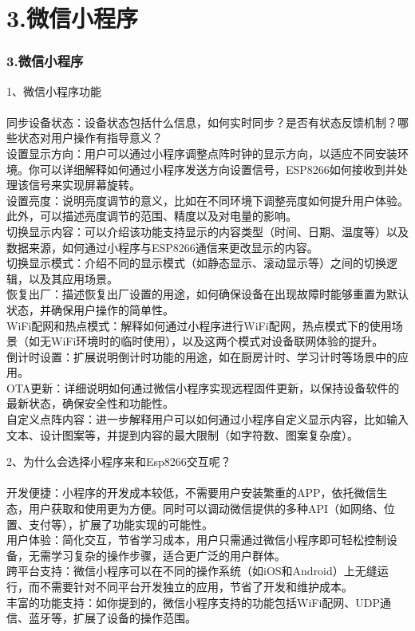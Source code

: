 \documentclass[16pt]{beamer}	%
\newcommand{\ftitle}[1]{\frametitle{#1}}	%
\begin{document}
		\section{3.微信小程序}
		\begin{frame}
			\ftitle{3.微信小程序}
	\small	1、微信小程序功能	\\ \hspace*{\fill} 
	\scriptsize	\\同步设备状态：设备状态包括什么信息，如何实时同步？是否有状态反馈机制？哪些状态对用户操作有指导意义？
		\\设置显示方向：用户可以通过小程序调整点阵时钟的显示方向，以适应不同安装环境。你可以详细解释如何通过小程序发送方向设置信号，ESP8266如何接收到并处理该信号来实现屏幕旋转。
		\\设置亮度：说明亮度调节的意义，比如在不同环境下调整亮度如何提升用户体验。此外，可以描述亮度调节的范围、精度以及对电量的影响。
		\\切换显示内容：可以介绍该功能支持显示的内容类型（时间、日期、温度等）以及数据来源，如何通过小程序与ESP8266通信来更改显示的内容。
		\\切换显示模式：介绍不同的显示模式（如静态显示、滚动显示等）之间的切换逻辑，以及其应用场景。
		\\恢复出厂：描述恢复出厂设置的用途，如何确保设备在出现故障时能够重置为默认状态，并确保用户操作的简单性。
		\\WiFi配网和热点模式：解释如何通过小程序进行WiFi配网，热点模式下的使用场景（如无WiFi环境时的临时使用），以及这两个模式对设备联网体验的提升。
		\\倒计时设置：扩展说明倒计时功能的用途，如在厨房计时、学习计时等场景中的应用。
		\\OTA更新：详细说明如何通过微信小程序实现远程固件更新，以保持设备软件的最新状态，确保安全性和功能性。\\自定义点阵内容：进一步解释用户可以如何通过小程序自定义显示内容，比如输入文本、设计图案等，并提到内容的最大限制（如字符数、图案复杂度）。
		\end{frame}
		\begin{frame}
			\small	2、为什么会选择小程序来和Esp8266交互呢？	\\ \hspace*{\fill} 
			\scriptsize	\\开发便捷：小程序的开发成本较低，不需要用户安装繁重的APP，依托微信生态，用户获取和使用更为方便。同时可以调动微信提供的多种API（如网络、位置、支付等），扩展了功能实现的可能性。
			\\用户体验：简化交互，节省学习成本，用户只需通过微信小程序即可轻松控制设备，无需学习复杂的操作步骤，适合更广泛的用户群体。
			\\跨平台支持：微信小程序可以在不同的操作系统（如iOS和Android）上无缝运行，而不需要针对不同平台开发独立的应用，节省了开发和维护成本。
			\\丰富的功能支持：如你提到的，微信小程序支持的功能包括WiFi配网、UDP通信、蓝牙等，扩展了设备的操作范围。
		\end{frame}
\end{document}
